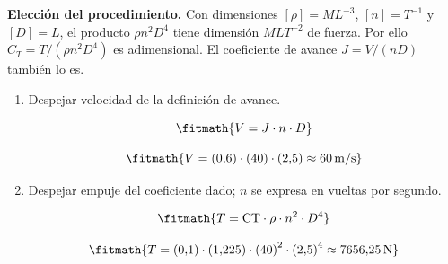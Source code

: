 \noindent\textbf{Elección del procedimiento.} Con dimensiones $[\rho]=ML^{-3}$, $[n]=T^{-1}$ y $[D]=L$, el producto $\rho n^2D^4$ tiene dimensión $MLT^{-2}$ de fuerza. Por ello $C_T=T/(\rho n^2D^4)$ es adimensional. El coeficiente de avance $J=V/(nD)$ también lo es.

\begin{enumerate}

\item Despejar velocidad de la definición de avance.

\[\fitmath{V=J\cdot n\cdot D}\]

\[\fitmath{V=(0{,}6)\cdot (40)\cdot (2{,}5)\approx 60\,\mathrm{m/s}}\]

\item Despejar empuje del coeficiente dado; $n$ se expresa en vueltas por segundo.

\[\fitmath{T=\mathrm{CT}\cdot \rho\cdot {n}^{2}\cdot {D}^{4}}\]

\[\fitmath{T=(0{,}1)\cdot (1{,}225)\cdot {(40)}^{2}\cdot {(2{,}5)}^{4}\approx 7656{,}25\,\mathrm{N}}\]

\end{enumerate}
